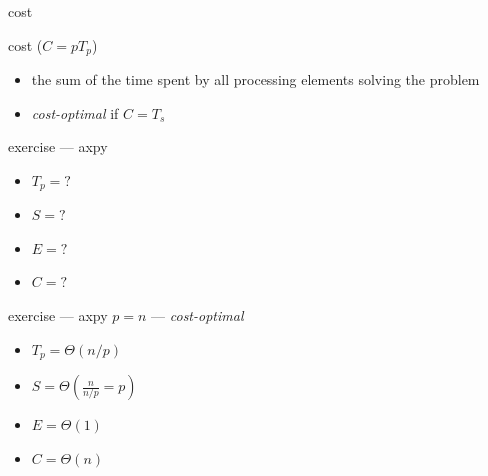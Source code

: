 \documentclass[10pt, t]{beamer}
\begin{document}
  \begin{frame}{cost}
    \begin{block}{cost ($C=pT_p$)}
      \begin{itemize}
        \item the sum of the time spent by all processing elements solving the
          problem
        \item \emph{cost-optimal} if $C=T_s$
      \end{itemize}
    \end{block}

    \vspace{-2ex}
    \begin{center}
    \end{center}
  \end{frame}

  \begin{frame}{exercise --- axpy}
    \begin{itemize}
      \item $T_p=?$
      \item $S=?$
      \item $E=?$
      \item $C=?$
    \end{itemize}
  \end{frame}

  \begin{frame}{exercise --- axpy}
    $p=n$ --- \emph{cost-optimal}
    \begin{itemize}
      \item $T_p=\Theta(n/p)$
      \item $S=\Theta(\frac{n}{n/p}=p)$
      \item $E=\Theta(1)$
      \item $C=\Theta(n)$
    \end{itemize}
  \end{frame}
\end{document}
